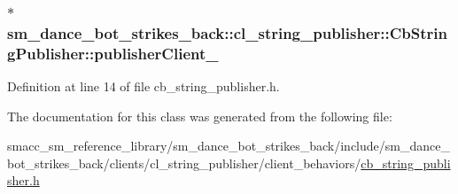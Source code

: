 \subsubsection[{\texorpdfstring{publisher\+Client\+\_\+}{publisherClient_}}]{$\ast$ sm\+\_\+dance\+\_\+bot\+\_\+strikes\+\_\+back\+::cl\+\_\+string\+\_\+publisher\+::\+Cb\+String\+Publisher\+::publisher\+Client\+\_\+}\hypertarget{classsm__dance__bot__strikes__back_1_1cl__string__publisher_1_1CbStringPublisher_afdbdb3c725b013af9f30fc04d7ab458b}{}\label{classsm__dance__bot__strikes__back_1_1cl__string__publisher_1_1CbStringPublisher_afdbdb3c725b013af9f30fc04d7ab458b}


Definition at line 14 of file cb\+\_\+string\+\_\+publisher.\+h.



The documentation for this class was generated from the following file\+:\begin{DoxyCompactItemize}
\item 
smacc\+\_\+sm\+\_\+reference\+\_\+library/sm\+\_\+dance\+\_\+bot\+\_\+strikes\+\_\+back/include/sm\+\_\+dance\+\_\+bot\+\_\+strikes\+\_\+back/clients/cl\+\_\+string\+\_\+publisher/client\+\_\+behaviors/\hyperlink{strikes__back_2include_2sm__dance__bot__strikes__back_2clients_2cl__string__publisher_2client__b6092546a14189497fb33fc7e70b5eb23}{cb\+\_\+string\+\_\+publisher.\+h}\end{DoxyCompactItemize}
